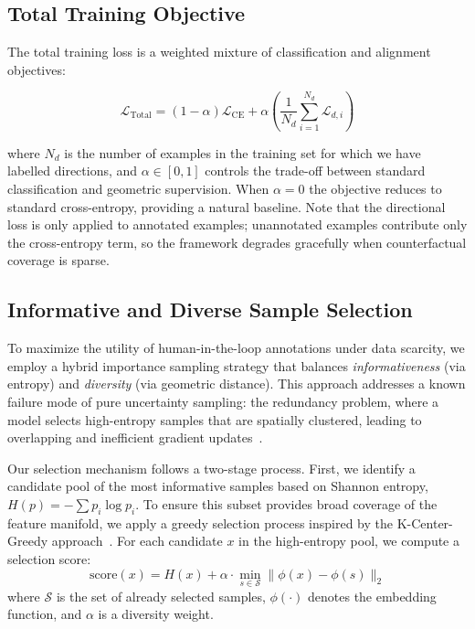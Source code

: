 \subsection{Total Training Objective} 

The total training loss is a weighted mixture of classification and alignment objectives:

\begin{equation}\label{eq:total_loss}
\mathcal{L}_{\text{Total}} = (1-\alpha)\mathcal{L}_{\text{CE}} + \alpha \left( \frac{1}{N_d} \sum^{N_d}_{i=1} \mathcal{L}_{d,i} \right)
\end{equation}

where $N_d$ is the number of examples in the training set for which we have labelled directions, and $\alpha \in [0,1]$ controls the trade-off between standard classification and geometric supervision. When $\alpha = 0$ the objective reduces to standard cross-entropy, providing a natural baseline. Note that the directional loss is only applied to annotated examples; unannotated examples contribute only the cross-entropy term, so the framework degrades gracefully when counterfactual coverage is sparse.

\subsection{Informative and Diverse Sample Selection}
To maximize the utility of human-in-the-loop annotations under data scarcity, we employ a hybrid importance sampling strategy that balances \textit{informativeness} (via entropy) and \textit{diversity} (via geometric distance). This approach addresses a known failure mode of pure uncertainty sampling: the redundancy problem, where a model selects high-entropy samples that are spatially clustered, leading to overlapping and inefficient gradient updates~\cite{shen2018deepactivelearningnamed}.

Our selection mechanism follows a two-stage process. First, we identify a candidate pool of the most informative samples based on Shannon entropy, $H(p) = -\sum p_i \log p_i$. To ensure this subset provides broad coverage of the feature manifold, we apply a greedy selection process inspired by the K-Center-Greedy approach~\cite{sener2018activelearning}. For each candidate $x$ in the high-entropy pool, we compute a selection score:
\begin{equation}
    \text{score}(x) = H(x) + \alpha \cdot \min_{s \in \mathcal{S}} \| \phi(x) - \phi(s) \|_2
\end{equation}
where $\mathcal{S}$ is the set of already selected samples, $\phi(\cdot)$ denotes the embedding function, and $\alpha$ is a diversity weight. 

